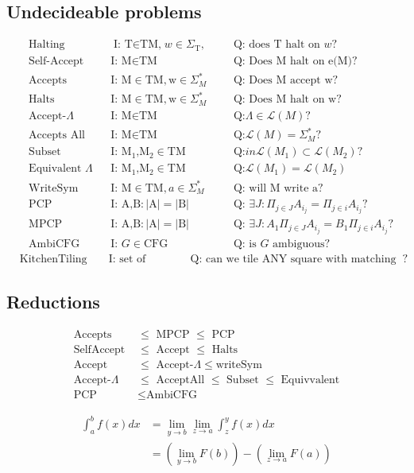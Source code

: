 \documentclass{article}
\theoremstyle{remark}
\numberwithin{equation}{section}
\begin{document}
\subsection{Undecideable problems}
\begin{align}
	&\text{Halting} &&\text{I: T$\in$TM,}w\in\Sigma_\text{T} \text{,}&&&\text{Q: does T halt on }w?\\
	&\text{Self-Accept} &&\text{I: M}\in\text{TM} &&&\text{Q: Does M halt on e(M)?}\\
	&\text{Accepts} &&\text{I: M}\in\text{TM},\text{w}\in\Sigma_M^*
	&&&\text{Q: Does M accept w?}\\
	&\text{Halts} &&\text{I: M}\in\text{TM},\text{w}\in\Sigma_M^* &&&\text{Q: Does M halt on w?}\\
	&\text{Accept-}\Lambda &&\text{I: M}\in\text{TM} &&&\text{Q:}\Lambda\in\mathcal{L}(M)?\\
	&\text{Accepts All} &&\text{I: M}\in\text{TM} &&&\text{Q:}\mathcal{L}(M)=\Sigma_M^*?\\
	&\text{Subset } &&\text{I: M$_1$,M$_2$}\in\text{TM} &&&\text{Q:}in\mathcal{L}(M_1)\subset\mathcal{L}(M_2)?\\
	&\text{Equivalent }\Lambda &&\text{I: M$_1$,M$_2$}\in\text{TM} &&&\text{Q:}\mathcal{L}(M_1)=\mathcal{L}(M_2)\\
	&\text{WriteSym } &&\text{I: M}\in\text{TM},a\in\Sigma_M^* &&&\text{Q: will M write a}?\\
	&\text{PCP } &&\text{I: A,B}:|\text{A}|=|\text{B}| &&&\text{Q: }\exists J: \Pi_{j\in J} A_{i_j} = \Pi_{j\in i} A_{i_j}?\\
	&\text{MPCP } &&\text{I: A,B}:|\text{A}|=|\text{B}| &&&\text{Q: }\exists J: A_1\Pi_{j\in J} A_{i_j} = B_1 \Pi_{j\in i} A_{i_j}?\\
	&\text{AmbiCFG } &&\text{I: }G\in\text{CFG} &&&\text{Q: is $G$ ambiguous}?
\end{align}
\begin{align}
	&\text{KitchenTiling } &&\text{I: set of tiles} &&&\text{Q: can we tile ANY square with matching sides}?
\end{align}
\subsection{Reductions}
\begin{align}
	\text{Accepts }&\leq \text{ MPCP } \leq \text{ PCP}\\
	\text{SelfAccept }&\leq\text{ Accept }\leq\text{ Halts}\\
	\text{Accept }&\leq \text{ Accept-}\Lambda \leq \text{writeSym}\\
	\text{Accept-}\Lambda&\leq\text{ AcceptAll }\leq\text{ Subset }\leq\text{ Equivvalent}\\
	\text{PCP }&\leq\text{AmbiCFG}
\end{align}

\begin{align*}
	\int_{a}^{b} f(x) dx &= \lim_{y\rightarrow b} \lim_{z\rightarrow a} \int_{z}^{y} f(x) dx \\
	&= (\lim_{y\rightarrow b} F(b)) - (\lim_{z\rightarrow a} F(a))
\end{align*}
\end{document}
